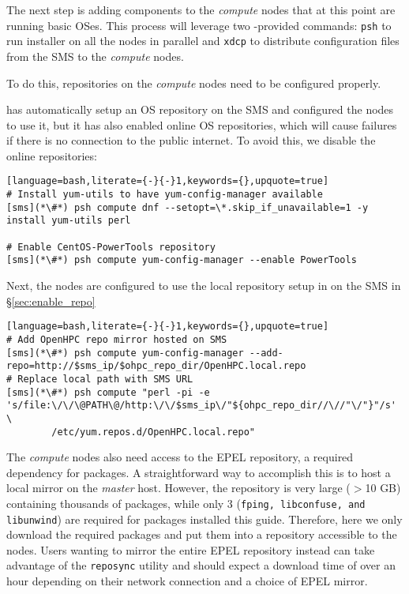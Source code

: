 
The next step is adding \OHPC{} components to the {\em compute} nodes that at this
point are running basic OSes.  This process will leverage two \xCAT{}-provided
commands: \texttt{psh} to run \texttt{\pkgmgr{}} installer on all the
nodes in parallel  and \texttt{xdcp} to distribute configuration files from the
SMS to the {\em compute} nodes. 

\noindent To do this, repositories on the {\em compute} nodes need to be configured
properly. 

\xCAT{} has automatically setup an  OS repository on the SMS and configured the
nodes to use it, but it has  also enabled online OS repositories, which will
cause  \texttt{\pkgmgr{}} failures if there is no connection to the public internet. 
To avoid this, we disable the online repositories:

\begin{lstlisting}[language=bash,literate={-}{-}1,keywords={},upquote=true]
# Install yum-utils to have yum-config-manager available
[sms](*\#*) psh compute dnf --setopt=\*.skip_if_unavailable=1 -y install yum-utils perl

# Enable CentOS-PowerTools repository
[sms](*\#*) psh compute yum-config-manager --enable PowerTools
\end{lstlisting}

\noindent Next, the nodes are configured to use the local \OHPC{} repository
setup in on the SMS in \S\ref{sec:enable_repo}

\begin{lstlisting}[language=bash,literate={-}{-}1,keywords={},upquote=true]
# Add OpenHPC repo mirror hosted on SMS
[sms](*\#*) psh compute yum-config-manager --add-repo=http://$sms_ip/$ohpc_repo_dir/OpenHPC.local.repo
# Replace local path with SMS URL
[sms](*\#*) psh compute "perl -pi -e 's/file:\/\/\@PATH\@/http:\/\/$sms_ip\/"${ohpc_repo_dir//\//"\/"}"/s' \
        /etc/yum.repos.d/OpenHPC.local.repo"
\end{lstlisting}

The {\em compute} nodes also need access to the EPEL repository, a required
dependency for \OHPC{} packages. A straightforward way to accomplish this is to
host a local mirror on the {\em master} host. However, the repository is very
large ($>$10 GB) containing thousands of packages, while only 3 (\texttt{fping,
libconfuse, and libunwind}) are required for packages installed this guide.  Therefore,
here we only download the required packages and put them into a repository
accessible to the nodes.  Users wanting to mirror the entire EPEL repository
instead can take advantage of the \texttt{reposync} utility and should expect a
download time of over an hour depending on their network connection and a choice
of EPEL mirror.


